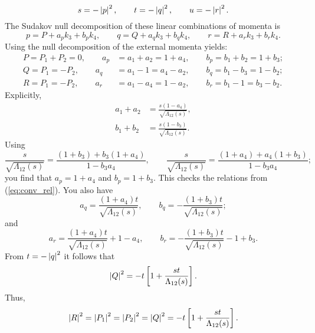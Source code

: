 \begin{equation}
	s = -\left\lvert p \right\rvert^{2}, \qquad t = -\left\lvert q \right\rvert^{2}, \qquad u = -\left\lvert r \right\rvert^{2}.
\end{equation}
The Sudakov null decomposition of these linear combinations of momenta is
\begin{equation}
	p = P + a_{p} k_{3} + b_{p} k_{4}, \qquad q = Q + a_{q} k_{3} + b_{q} k_{4}, \qquad r = R + a_{r} k_{3} + b_{r} k_{4}.
\end{equation}
Using the null decomposition of the external momenta yields:
\begin{align}
	P = P_{1} + P_{2} = 0, \qquad a_{p} &= a_{1} + a_{2} = 1 + a_{4}, \qquad b_{p} = b_{1} + b_{2} = 1 + b_{3}; \\
	Q = P_{1} = -P_{2}, \qquad a_{q} &= a_{1} - 1 = a_{4} - a_{2}, \qquad b_{q} = b_{1} - b_{3} = 1 - b_{2}; \\
	R = P_{1} = -P_{2}, \qquad a_{r} &= a_{1} - a_{4} = 1 - a_{2}, \qquad b_{r} = b_{1} - 1 = b_{3} - b_{2}.
\end{align}
Explicitly,
\begin{align}
	a_{1} + a_{2} &= \frac{ s \left(1 - a_{4} \right) }{\sqrt{\Lambda_{12}(s)}}, \\
	b_{1} + b_{2} &= \frac{ s \left(1 - b_{3} \right) }{\sqrt{\Lambda_{12}(s)}}.
\end{align}
Using
\begin{equation}
	\frac{s}{\sqrt{\Lambda_{12}(s)}} = \frac{\left( 1 + b_{3} \right) + b_{3} \left( 1 + a_{4} \right)}{1 - b_{3} a_{4}}, \qquad \frac{s}{\sqrt{\Lambda_{12}(s)}} = \frac{\left( 1 + a_{4} \right) + a_{4} \left( 1 + b_{3} \right)}{1 - b_{3} a_{4}};
\end{equation}
you find that $a_{p} = 1 + a_{4}$ and $b_{p} = 1 + b_{3}$. This checks the relations from (\ref{eq:conv_rel}). You also have
\begin{equation}
	a_{q} = \frac{\left( 1 + a_{4} \right) t}{\sqrt{\Lambda_{12}(s)}}, \qquad
	b_{q} = -\frac{\left( 1 + b_{3} \right) t}{\sqrt{\Lambda_{12}(s)}};
\end{equation}
and
\begin{equation}
	a_{r} = \frac{\left( 1 + a_{4} \right) t}{\sqrt{\Lambda_{12}(s)}} + 1 - a_{4}, \qquad 
	b_{r} = - \frac{\left( 1 + b_{3} \right) t}{\sqrt{\Lambda_{12}(s)}} - 1 + b_{3}.
\end{equation}
From $t = -\left\lvert q \right\rvert^{2}$ it follows that
\begin{equation}
	\left\lvert Q \right\rvert^{2} = -t \left[ 1 + \frac{s t}{\Lambda_{12}(s)} \right].
\end{equation}
Thus,
\begin{equation}
	\left\lvert R \right\rvert^{2} = \left\lvert P_{1} \right\rvert^{2} = \left\lvert P_{2} \right\rvert^{2} = \left\lvert Q \right\rvert^{2} = -t \left[ 1 + \frac{s t}{\Lambda_{12}(s)} \right].
\end{equation}

